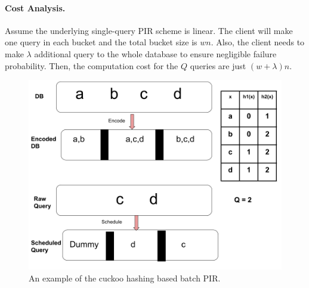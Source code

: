 {\paragraph{Cost Analysis.} 
Assume the underlying single-query PIR scheme is linear.
The client will make one query in each bucket and the total bucket size is $wn$.
Also, the client needs to make $\lambda$ additional query to the whole database to ensure negligible failure probability.
Then, the computation cost for the $Q$ queries are just $(w+\lambda)n$.

    
    
\begin{figure}
    \includegraphics[scale=0.45]{scribimg_batchpir.png}
    \caption{An example of the cuckoo hashing based batch PIR. \label{fig:sealpir}}
\end{figure}

}











